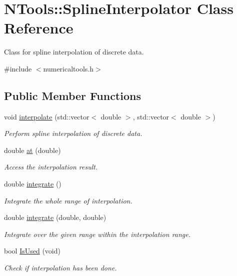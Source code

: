 \hypertarget{class_n_tools_1_1_spline_interpolator}{}\section{N\+Tools\+::Spline\+Interpolator Class Reference}
\label{class_n_tools_1_1_spline_interpolator}


Class for spline interpolation of discrete data.  




{\ttfamily \#include $<$numericaltools.\+h$>$}

\subsection*{Public Member Functions}
\begin{DoxyCompactItemize}
\item 
void \mbox{\hyperlink{class_n_tools_1_1_spline_interpolator_aebbfd2aec32caa7803aa4025b52bff0d}{interpolate}} (std\+::vector$<$ double $>$, std\+::vector$<$ double $>$)
\begin{DoxyCompactList}\small\item\em Perform spline interpolation of discrete data. \end{DoxyCompactList}\item 
double \mbox{\hyperlink{class_n_tools_1_1_spline_interpolator_a6c97e5781f96b2c5025cb23b3b2df27c}{at}} (double)
\begin{DoxyCompactList}\small\item\em Access the interpolation result. \end{DoxyCompactList}\item 
double \mbox{\hyperlink{class_n_tools_1_1_spline_interpolator_a2551cbbe2a947b73ff22edf74351a12e}{integrate}} ()
\begin{DoxyCompactList}\small\item\em Integrate the whole range of interpolation. \end{DoxyCompactList}\item 
double \mbox{\hyperlink{class_n_tools_1_1_spline_interpolator_aa7dadf8466c74b42804fe248158c07f5}{integrate}} (double, double)
\begin{DoxyCompactList}\small\item\em Integrate over the given range within the interpolation range. \end{DoxyCompactList}\item 
bool \mbox{\hyperlink{class_n_tools_1_1_spline_interpolator_a0e72de79c14d3288a065fc2da8be716c}{Is\+Used}} (void)
\begin{DoxyCompactList}\small\item\em Check if interpolation has been done. \end{DoxyCompactList}\end{DoxyCompactItemize}


